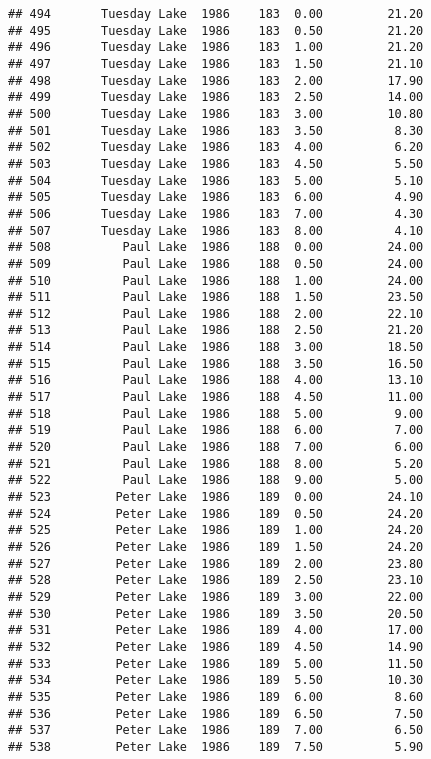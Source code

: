 \documentclass[
]{article}
\begin{document}
\begin{verbatim}
## 494       Tuesday Lake  1986    183  0.00         21.20
## 495       Tuesday Lake  1986    183  0.50         21.20
## 496       Tuesday Lake  1986    183  1.00         21.20
## 497       Tuesday Lake  1986    183  1.50         21.10
## 498       Tuesday Lake  1986    183  2.00         17.90
## 499       Tuesday Lake  1986    183  2.50         14.00
## 500       Tuesday Lake  1986    183  3.00         10.80
## 501       Tuesday Lake  1986    183  3.50          8.30
## 502       Tuesday Lake  1986    183  4.00          6.20
## 503       Tuesday Lake  1986    183  4.50          5.50
## 504       Tuesday Lake  1986    183  5.00          5.10
## 505       Tuesday Lake  1986    183  6.00          4.90
## 506       Tuesday Lake  1986    183  7.00          4.30
## 507       Tuesday Lake  1986    183  8.00          4.10
## 508          Paul Lake  1986    188  0.00         24.00
## 509          Paul Lake  1986    188  0.50         24.00
## 510          Paul Lake  1986    188  1.00         24.00
## 511          Paul Lake  1986    188  1.50         23.50
## 512          Paul Lake  1986    188  2.00         22.10
## 513          Paul Lake  1986    188  2.50         21.20
## 514          Paul Lake  1986    188  3.00         18.50
## 515          Paul Lake  1986    188  3.50         16.50
## 516          Paul Lake  1986    188  4.00         13.10
## 517          Paul Lake  1986    188  4.50         11.00
## 518          Paul Lake  1986    188  5.00          9.00
## 519          Paul Lake  1986    188  6.00          7.00
## 520          Paul Lake  1986    188  7.00          6.00
## 521          Paul Lake  1986    188  8.00          5.20
## 522          Paul Lake  1986    188  9.00          5.00
## 523         Peter Lake  1986    189  0.00         24.10
## 524         Peter Lake  1986    189  0.50         24.20
## 525         Peter Lake  1986    189  1.00         24.20
## 526         Peter Lake  1986    189  1.50         24.20
## 527         Peter Lake  1986    189  2.00         23.80
## 528         Peter Lake  1986    189  2.50         23.10
## 529         Peter Lake  1986    189  3.00         22.00
## 530         Peter Lake  1986    189  3.50         20.50
## 531         Peter Lake  1986    189  4.00         17.00
## 532         Peter Lake  1986    189  4.50         14.90
## 533         Peter Lake  1986    189  5.00         11.50
## 534         Peter Lake  1986    189  5.50         10.30
## 535         Peter Lake  1986    189  6.00          8.60
## 536         Peter Lake  1986    189  6.50          7.50
## 537         Peter Lake  1986    189  7.00          6.50
## 538         Peter Lake  1986    189  7.50          5.90

\end{verbatim}
\end{document}

